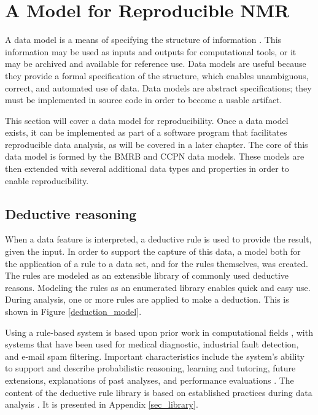 \section{A Model for Reproducible NMR}

A data model is a means of specifying the structure of information  
\cite{codd1970relational}.  This
information may be used as inputs and outputs for computational tools, or
it may be archived and available for reference use.  Data models are useful
because they provide a formal specification of the structure, which enables
unambiguous, correct, and automated use of data.  Data models are
abstract specifications; they must be implemented in source code in order
to become a usable artifact.

This section will cover a data model for reproducibility.  Once a data
model exists, it can be implemented as part of a software program that
facilitates reproducible data analysis, as will be covered in a later 
chapter.  The core of this data model is formed by the BMRB \cite{bmrb}
and CCPN \cite{ccpn} data models.  These models are then extended with
several additional data types and properties in order to enable 
reproducibility.


\subsection*{Deductive reasoning}
When a data feature is interpreted, a deductive rule is used to provide
the result, given the input.  In order to support the capture of this data, 
a model both for the application of a rule to a data set, and for the rules
themselves, was created.  The rules are modeled as an extensible library of 
commonly used deductive reasons.  Modeling the rules as an enumerated library 
enables quick and easy use.  During analysis, one or more rules are applied to 
make a deduction.  This is shown in Figure \ref{deduction_model}.

Using a rule-based system is based upon prior work in computational fields
\cite{buchanan1984rule, reiter1987theory}, with systems that have been used for 
medical diagnostic, industrial fault detection, and e-mail spam filtering.
Important characteristics include the system's ability to support and describe
probabilistic reasoning, learning and tutoring, future extensions, explanations
of past analyses, and performance evaluations \cite{buchanan1984rule}.
The content of the deductive rule library is based on 
established practices during data analysis \cite{guerry2011automated, hncacb,
hnco, cbcaconh, hbhaconh, picky, xeasy, sparky, ccpn}.
It is presented in Appendix \ref{sec_library}.



